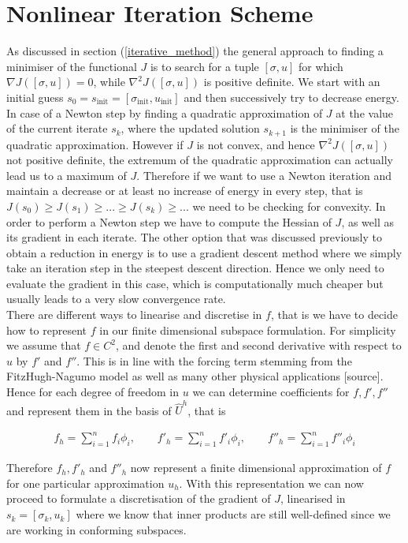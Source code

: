 \documentclass[../draft_1.tex]{subfiles}
\begin{document}
\section{Nonlinear Iteration Scheme}
As discussed in section (\ref{iterative_method}) the general approach to finding a minimiser of the functional $J$ is to search for a tuple $[\sigma, u]$ for which $\nabla  J ([\sigma, u])= 0$, while $\nabla^2 J ([\sigma, u]) $ is positive definite. We start with an initial guess $s_0 = s_{\text{init}} = [\sigma_{\text{init}}, u_{\text{init}}]$ and then successively try to decrease energy. In case of a Newton step by finding a quadratic approximation of $J$ at the value of the current iterate $s_k$, where the updated solution $s_{k+1}$ is the minimiser of the quadratic approximation. However if $J$ is not convex, and hence $\nabla^2 J ([\sigma, u]) $ not positive definite, the extremum of the quadratic approximation can actually lead us to a maximum of $J$. Therefore if we want to use a Newton iteration and maintain a decrease or at least no increase of energy in every step, that is $J(s_0) \geq J(s_1) \geq ... \geq J(s_k) \geq ... $ we need to be checking for convexity. In order to perform a Newton step we have to compute the Hessian of $J$, as well as its gradient in each iterate. The other option that was discussed previously to obtain a reduction in energy is to use a gradient descent method where we simply take an iteration step in the steepest descent direction. Hence we only need to evaluate the gradient in this case, which is computationally much cheaper but usually leads to a very slow convergence rate.
\smallskip
\\
There are different ways to linearise and discretise in $f$, that is we have to decide how to represent $f$ in our finite dimensional subspace formulation. For simplicity we assume that $f \in C^2$, and denote the first and second derivative with respect to $u$ by $f'$ and $f''$. This is in line with the forcing term stemming from the FitzHugh-Nagumo model as well as many other physical applications [source]. Hence for each degree of freedom in $u$ we can determine coefficients for $f, f', f''$ and represent them in the basis of $\hat{U}^h$, that is 
\begin{ceqn}
	\begin{align}
	\label{discretisation_f}
f_h= \sum_{i=1}^{n} f_i \phi_i, \qquad f'_h = \sum_{i=1}^{n} f'_i \phi_i, \qquad  f''_h = \sum_{i=1}^{n} f''_i \phi_i
	\end{align}
\end{ceqn}
Therefore $f_h, f'_h$ and $f''_h$ now represent a finite dimensional approximation of $f$ for one particular approximation $u_h$. With this representation we can now proceed to formulate a discretisation of the gradient of $J$, linearised in $s_k = [\sigma_k, u_k]$ where we know that inner products are still well-defined since we are working in conforming subspaces.
\end{document}
